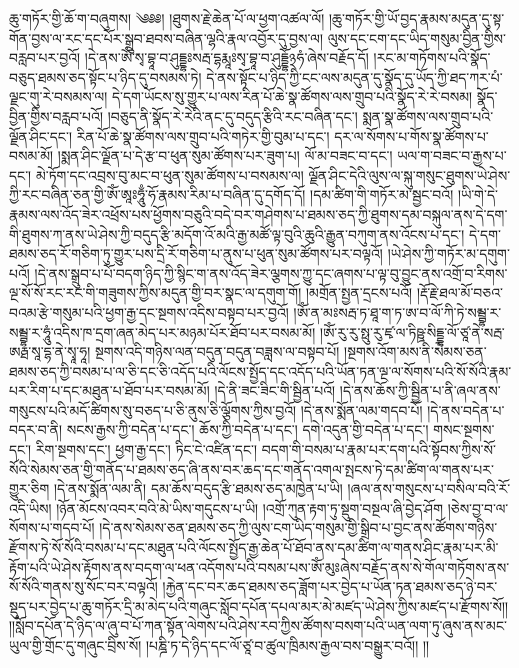 \setcounter{footnote}{0} 
ཆུ་གཏོར་གྱི་ཆོ་ག་བཞུགས། ༄༅༅། །ཐུགས་རྗེ་ཆེན་པོ་ལ་ཕྱག་འཚལ་ལོ། །ཆུ་གཏོར་གྱི་ཡོ་བྱད་རྣམས་མདུན་དུ་སྟ་གོན་བྱས་ལ་རང་དང་པོར་སྒྲུབ་ཐབས་བཞིན་ལྷའི་རྣལ་འབྱོར་དུ་བྱས་ལ། ལུས་དང་ངག་དང་ཡིད་གསུམ་བྱིན་གྱིས་བརླབ་པར་བྱའོ། །དེ་ནས་ཨོཾ་སྭ་བྷཱ་བ་ཤུདྡྷཿསརྦ་དྷརྨཱཿསྭ་བྷཱ་བ་ཤུདྡྷོ྅ཧཾ་ཞེས་བརྗོད་དོ། །རང་མ་གཏོགས་པའི་སྣོད་བཅུད་ཐམས་ཅད་སྟོང་པ་ཉིད་དུ་བསམས་ཏེ། དེ་ནས་སྟོང་པ་ཉིད་ཀྱི་ངང་ལས་མདུན་དུ་སྣོད་དུ་ཡོད་ཀྱི་ཐད་ཀར་པཾ་ལྗང་གུ་རེ་བསམས་ལ། དེ་དག་ཡོངས་སུ་གྱུར་པ་ལས་རིན་པོ་ཆེ་སྣ་ཚོགས་ལས་གྲུབ་པའི་སྣོད་རེ་རེ་བསམ། སྣོད་བྱིན་གྱིས་བརླབ་པའོ། །བཅུད་ནི་སྣོད་རེ་རེའི་ནང་དུ་བདུད་རྩིའི་རང་བཞིན་དང་། སྨན་སྣ་ཚོགས་ལས་གྲུབ་པའི་ལྗོན་ཤིང་དང་། རིན་པོ་ཆེ་སྣ་ཚོགས་ལས་གྲུབ་པའི་གཏེར་གྱི་བུམ་པ་དང་། དར་ལ་སོགས་པ་གོས་སྣ་ཚོགས་པ་བསམ་མོ། །སྨན་ཤིང་ལྗོན་པ་དེ་རྩ་བ་ཕུན་སུམ་ཚོགས་པར་ཟུག་པ། ལོ་མ་བཟང་བ་དང་། ཡལ་ག་བཟང་བ་རྒྱས་པ་དང་། མེ་ཏོག་དང་འབྲས་བུ་མང་བ་ཕུན་སུམ་ཚོགས་པ་བསམས་ལ། ལྗོན་ཤིང་དེའི་ལུས་ལ་སྐུ་གསུང་ཐུགས་ཡེ་ཤེས་ཀྱི་རང་བཞིན་ཅན་གྱི་ཨོཾ་ཨཱཿཧཱུྃ་ཧོ་རྣམས་རིམ་པ་བཞིན་དུ་དགོད་དོ། །དམ་ཚིག་གི་གཏོར་མ་སྦྱང་བའོ། །ཡི་གེ་དེ་རྣམས་ལས་འོད་ཟེར་འཕྲོས་པས་ཕྱོགས་བཅུའི་བདེ་བར་གཤེགས་པ་ཐམས་ཅད་ཀྱི་ཐུགས་དམ་བསྐུལ་ནས་དེ་དག་གི་ཐུགས་ཀ་ནས་ཡེ་ཤེས་ཀྱི་བདུད་རྩི་མདོག་འོ་མའི་རྒྱ་མཚོ་ལྟ་བུའི་ཆུའི་རྒྱུན་བཀུག་ནས་འོངས་པ་དང་། དེ་དག་ཐམས་ཅད་རོ་གཅིག་ཏུ་གྱུར་པས་དྲི་རོ་གཅིག་པ་ནུས་པ་ཕུན་སུམ་ཚོགས་པར་བལྟའོ། །ཡེ་ཤེས་ཀྱི་གཏོར་མ་དགུག་པའོ། །དེ་ནས་སྒྲུབ་པ་པོ་བདག་ཉིད་ཀྱི་སྙིང་ག་ནས་འོད་ཟེར་ལྕགས་ཀྱུ་དང་ཞགས་པ་ལྟ་བུ་བྱུང་ནས་འགྲོ་བ་རིགས་ལྔ་སོ་སོ་རང་རང་གི་གཟུགས་ཀྱིས་མདུན་གྱི་བར་སྣང་ལ་དགུག་གོ། །མགྲོན་སྤྱན་དྲངས་པའོ། །རྡོ་རྗེ་ཐལ་མོ་བཅའ་བའམ་རྩེ་གསུམ་པའི་ཕྱག་རྒྱ་དང་སྔགས་འདིས་བསྟབ་པར་བྱའོ། །ཨོཾ་ན་མཿསརྦ་ཏ་ཐཱ་ག་ཏ་ཨ་བ་ལོ་ཀི་ཏེ་སམྦྷ་ར་སམྦྷ་ར་ཧཱུཾ་འདིས་ཁ་དྲག་ཞན་མེད་པར་མཉམ་པོར་ཐོབ་པར་བསམ་མོ། །ཨོཾ་རུ་རུ་སྥུ་རུ་ཛྭ་ལ་ཏིཥྛ་སིདྡྷ་ལོ་ཙཱ་ནེ་སརྦ་ཨརྠ་སཱ་དྷ་ནེ་སྭཱ་ཧཱ། སྔགས་འདི་གཉིས་ལན་བདུན་བདུན་བཟླས་ལ་བསྟབ་པོ། །སྔགས་འོག་མས་ནི་སེམས་ཅན་ཐམས་ཅད་ཀྱི་བསམ་པ་ལ་ཅི་དང་ཅི་འདོད་པའི་ལོངས་སྤྱོད་དང་འདོད་པའི་ཡོན་ཏན་ལྔ་ལ་སོགས་པའི་སོ་སོའི་རྣམ་པར་རིག་པ་དང་མཐུན་པ་ཐོབ་པར་བསམ་མོ། །དེ་ནི་ཟང་ཟིང་གི་སྦྱིན་པའོ། །དེ་ནས་ཆོས་ཀྱི་སྦྱིན་པ་ནི་ཞལ་ནས་གསུངས་པའི་མདོ་ཚིགས་སུ་བཅད་པ་ཅི་ནུས་ཅི་ལྕོགས་ཀྱིས་བྱའོ། །དེ་ནས་སྨོན་ལམ་གདབ་པོ། །དེ་ནས་བདེན་པ་བདར་བ་ནི། སངས་རྒྱས་ཀྱི་བདེན་པ་དང་། ཆོས་ཀྱི་བདེན་པ་དང་། དགེ་འདུན་གྱི་བདེན་པ་དང་། གསང་སྔགས་དང་། རིག་སྔགས་དང་། ཕྱག་རྒྱ་དང་། ཏིང་ངེ་འཛིན་དང་། བདག་གི་བསམ་པ་རྣམ་པར་དག་པའི་སྟོབས་ཀྱིས་སོ་སོའི་སེམས་ཅན་གྱི་གནོད་པ་ཐམས་ཅད་ཞི་ནས་བར་ཆད་དང་གནོད་འགལ་སྤངས་ཏེ་དམ་ཚིག་ལ་གནས་པར་གྱུར་ཅིག །དེ་ནས་སྨོན་ལམ་ནི། དམ་ཆོས་བདུད་རྩི་ཐམས་ཅད་མཁྱེན་པ་ཡི། །ཞལ་ནས་གསུངས་པ་བསིལ་བའི་རོ་འདི་ཡིས། །ཉོན་མོངས་འབར་བའི་མེ་ཡིས་གདུངས་པ་ཡི། །འགྲོ་ཀུན་རྟག་ཏུ་སྡུག་བསྔལ་ཞི་བྱེད་ཤོག །ཅེས་བྱ་བ་ལ་སོགས་པ་གདབ་པོ། །དེ་ནས་སེམས་ཅན་ཐམས་ཅད་ཀྱི་ལུས་ངག་ཡིད་གསུམ་གྱི་སྒྲིབ་པ་བྱང་ནས་ཚོགས་གཉིས་རྫོགས་ཏེ་སོ་སོའི་བསམ་པ་དང་མཐུན་པའི་ལོངས་སྤྱོད་རྒྱ་ཆེན་པོ་ཐོབ་ནས་དམ་ཚིག་ལ་གནས་ཤིང་རྣམ་པར་མི་རྟོག་པའི་ཡེ་ཤེས་རྟོགས་ནས་བདག་ལ་ཕན་འདོགས་པའི་བསམ་པས་ཨོཾ་མུཿཞེས་བརྗོད་ནས་སེ་གོལ་གཏོགས་ནས་སོ་སོའི་གནས་སུ་སོང་བར་བལྟའོ། །རྐྱེན་དང་བར་ཆད་ཐམས་ཅད་ཟློག་པར་བྱེད་པ་ཡོན་ཏན་ཐམས་ཅད་ཉེ་བར་སྡུད་པར་བྱེད་པ་ཆུ་གཏོར་དྲི་མ་མེད་པའི་གཞུང་སློབ་དཔོན་དཔལ་མར་མེ་མཛད་ཡེ་ཤེས་ཀྱིས་མཛད་པ་རྫོགས་སོ།། །།སློབ་དཔོན་དེ་ཉིད་ལ་ཞུ་བ་པོ་ཀན་སྟོན་ལེགས་པའི་ཤེས་རབ་ཀྱིས་ཚོགས་བསག་པའི་ཡན་ལག་ཏུ་ཞུས་ནས་མང་ཡུལ་གྱི་གྲོང་དུ་གཞུང་བྲིས་སོ། །པཎྜི་ཏ་དེ་ཉིད་དང་ལོ་ཙཱ་བ་ཚུལ་ཁྲིམས་རྒྱལ་བས་བསྒྱུར་བའོ།། །།